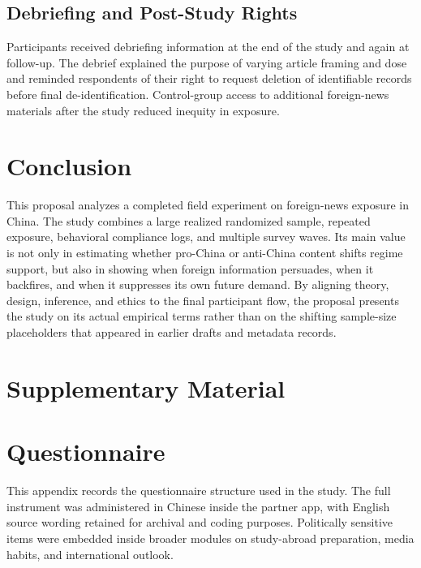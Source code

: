 \documentclass[12pt,american]{article}
\begin{document}
\subsection{Debriefing and Post-Study Rights}

Participants received debriefing information at the end of the study and again at follow-up. The debrief explained the purpose of varying article framing and dose and reminded respondents of their right to request deletion of identifiable records before final de-identification. Control-group access to additional foreign-news materials after the study reduced inequity in exposure.

\section{Conclusion}

This proposal analyzes a completed field experiment on foreign-news exposure in China. The study combines a large realized randomized sample, repeated exposure, behavioral compliance logs, and multiple survey waves. Its main value is not only in estimating whether pro-China or anti-China content shifts regime support, but also in showing when foreign information persuades, when it backfires, and when it suppresses its own future demand. By aligning theory, design, inference, and ethics to the final participant flow, the proposal presents the study on its actual empirical terms rather than on the shifting sample-size placeholders that appeared in earlier drafts and metadata records.

\newpage
\hypersetup{pageanchor=false}
\appendix
\section*{Supplementary Material}
\setcounter{page}{0}
\thispagestyle{empty}
\newpage
\renewcommand{\thepage}{SI-\arabic{page}}
\hypersetup{pageanchor=true}
\setcounter{figure}{0}
\renewcommand{\thefigure}{SI.\arabic{figure}}
\setcounter{table}{0}
\renewcommand{\thetable}{SI.\arabic{table}}

\section{Questionnaire}

This appendix records the questionnaire structure used in the study. The full instrument was administered in Chinese inside the partner app, with English source wording retained for archival and coding purposes. Politically sensitive items were embedded inside broader modules on study-abroad preparation, media habits, and international outlook.
\end{document}

